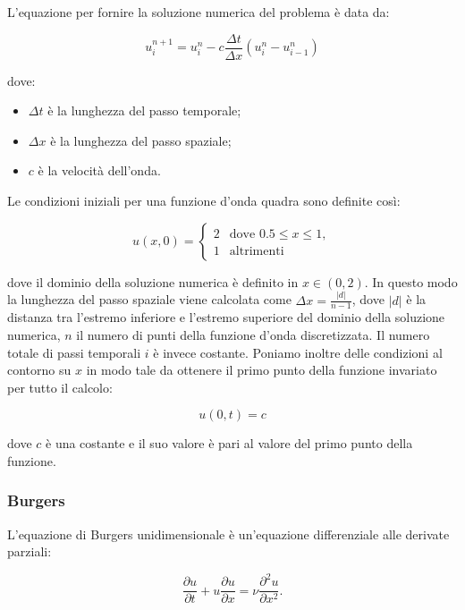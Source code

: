 \noindent
L’equazione per fornire la soluzione numerica del problema è data da:

\begin{equation}
u_i^{n+1} = u_i^n - c \frac{\Delta t}{\Delta x}(u_i^n-u_{i-1}^n)
\end{equation}

\noindent
dove:
\begin{itemize}
\item $\Delta t$ è la lunghezza del passo temporale;
\item $\Delta x$ è la lunghezza del passo spaziale;
\item $c$ è la velocità dell'onda.
\end{itemize}


\noindent
Le condizioni iniziali per una funzione d’onda quadra sono definite così:

\begin{equation}
u(x,0)=\begin{cases}2 & \text{dove } 0.5\leq x \leq 1,\\
1 & \text{altrimenti} 
\end{cases}
\end{equation}

\noindent
dove il dominio della soluzione numerica è definito in $x\in(0,2)$. In questo modo la lunghezza del passo spaziale viene calcolata come $\Delta x = \frac{|d|}{n - 1}$, dove $|d|$ è la distanza tra l'estremo inferiore e l'estremo superiore del dominio della soluzione numerica, $n$ il numero di punti della funzione d'onda discretizzata. Il numero totale di passi temporali $i$ è invece costante.
\noindent
Poniamo inoltre delle condizioni al contorno su $x$ in modo tale da ottenere il primo punto della funzione invariato per tutto il calcolo:

\begin{equation}
u(0,t) = c 
\end{equation}

\noindent
dove $c$ è una costante e il suo valore è pari al valore del primo punto della funzione.

\subsubsection*{Burgers}
L’equazione di Burgers unidimensionale è un’equazione differenziale alle derivate parziali: 

\begin{equation}
\frac{\partial u}{\partial t} + u \frac{\partial u}{\partial x} = \nu \frac{\partial ^2u}{\partial x^2}.
\end{equation}

